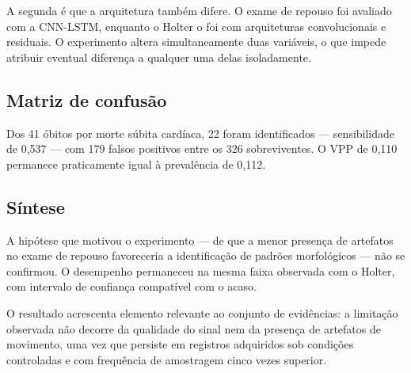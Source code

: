 A segunda é que a arquitetura também difere. O exame de repouso foi avaliado
com a CNN-LSTM, enquanto o Holter o foi com arquiteturas convolucionais e
residuais. O experimento altera simultaneamente duas variáveis, o que impede
atribuir eventual diferença a qualquer uma delas isoladamente.

\subsection{Matriz de confusão}
\label{subsec:cnnlstm-confusao}

\begin{table}[h!]
	\captionsetup{width=11cm}
\end{table}

Dos 41 óbitos por morte súbita cardíaca, 22 foram identificados ---
sensibilidade de 0,537 --- com 179 falsos positivos entre os 326
sobreviventes. O \gls{VPP} de 0,110 permanece praticamente igual à
prevalência de 0,112.

\subsection{Síntese}
\label{subsec:cnnlstm-sintese}

A hipótese que motivou o experimento --- de que a menor presença de
artefatos no exame de repouso favoreceria a identificação de padrões
morfológicos --- não se confirmou. O desempenho permaneceu na mesma faixa
observada com o Holter, com intervalo de confiança compatível com o acaso.

O resultado acrescenta elemento relevante ao conjunto de evidências: a
limitação observada não decorre da qualidade do sinal nem da presença de
artefatos de movimento, uma vez que persiste em registros adquiridos sob
condições controladas e com frequência de amostragem cinco vezes superior.



